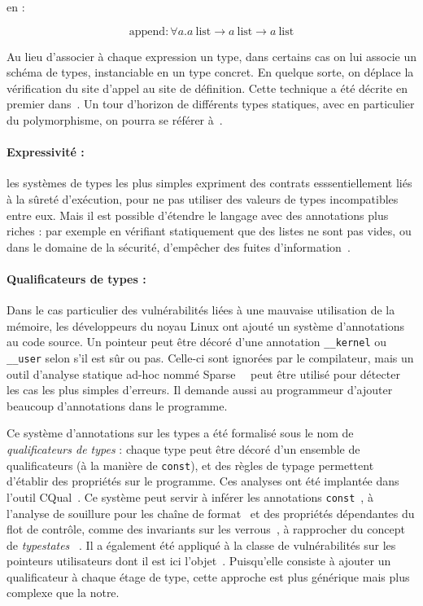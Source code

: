 en :

\[ \textrm{append} : ∀ a.
   a~\textrm{list} → a~\textrm{list} → a~\textrm{list}
\]



Au lieu d'associer à chaque expression un type, dans certains cas on lui associe
un schéma de types, instanciable en un type concret. En quelque sorte, on
déplace la vérification du site d'appel au site de définition. Cette technique a
été décrite en premier dans~\cite{Milner78}.
Un tour d'horizon de différents types statiques, avec en particulier du
polymorphisme, on pourra se référer à~\cite{TAPL}.

\paragraph{Expressivité :} les systèmes de types les plus simples expriment des
contrats esssentiellement liés à la sûreté d'exécution, pour ne pas utiliser des
valeurs de types incompatibles entre eux. Mais il est possible d'étendre le
langage avec des annotations plus riches : par exemple en vérifiant statiquement
que des listes ne sont pas vides\cite{lightweight-static-capabilities}, ou dans
le domaine de la sécurité, d'empêcher des fuites d'information~\cite{LZ06a}.

\paragraph{Qualificateurs de types :} Dans le cas particulier des vulnérabilités
liées à une mauvaise utilisation de la mémoire, les développeurs du noyau Linux
ont ajouté un système d'annotations au code source. Un pointeur peut être décoré
d'une annotation \texttt{\_\_kernel} ou \texttt{\_\_user} selon s'il est sûr ou
pas. Celle-ci sont ignorées par le compilateur, mais un outil d'analyse statique
ad-hoc nommé Sparse~~\cite{TorvaldsSparse} %
peut être utilisé pour détecter les cas les plus simples d'erreurs.
Il demande aussi au programmeur d'ajouter beaucoup d'annotations dans le
programme. %

Ce système d'annotations sur les types a été formalisé sous le nom de
\emph{qualificateurs de types} : chaque type peut être décoré d'un ensemble de
qualificateurs (à la manière de \texttt{const}), et des règles de typage
permettent d'établir des propriétés sur le programme. Ces analyses ont été
implantée dans l'outil CQual~\cite{toplas-quals}. Ce système peut servir à
inférer les annotations \texttt{const}~\cite{pldi99}, à l'analyse de souillure
pour les chaîne de format~\cite{usenix01} %
et des propriétés dépendantes du flot de contrôle, comme des invariants sur les
verrous~\cite{pldi02}, à rapprocher du concept de \emph{typestates}
~\cite{tse12-typestate}. Il a également été appliqué à la classe de
vulnérabilités sur les pointeurs utilisateurs dont il est ici
l'objet~\cite{cquk-usenix04}. Puisqu'elle consiste à ajouter un qualificateur à
chaque étage de type, cette approche est plus générique mais plus complexe que
la notre. %

